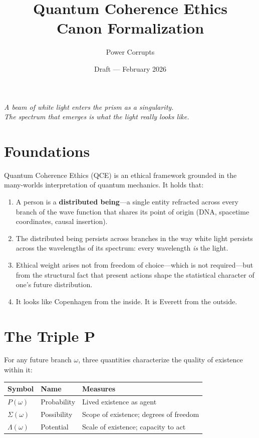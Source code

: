 \documentclass[12pt]{article}
\title{\textbf{Quantum Coherence Ethics}\\[4pt] Canon Formalization}
\author{Power Corrupts}
\date{Draft --- February 2026}
\begin{document}
\maketitle

\begin{center}
\textit{A beam of white light enters the prism as a singularity.\\
The spectrum that emerges is what the light really looks like.}
\end{center}

\section{Foundations}

Quantum Coherence Ethics (QCE) is an ethical framework grounded in the many-worlds interpretation of quantum mechanics. It holds that:

\begin{enumerate}[label=(\roman*)]
\item A person is a \textbf{distributed being}---a single entity refracted across every branch of the wave function that shares its point of origin (DNA, spacetime coordinates, causal insertion).
\item The distributed being persists across branches in the way white light persists across the wavelengths of its spectrum: every wavelength \textit{is} the light.
\item Ethical weight arises not from freedom of choice---which is not required---but from the structural fact that present actions shape the statistical character of one's future distribution.
\item It looks like Copenhagen from the inside. It is Everett from the outside.
\end{enumerate}

\section{The Triple P}

For any future branch $\omega$, three quantities characterize the quality of existence within it:

\begin{center}
\begin{tabular}{lll}
\toprule
\textbf{Symbol} & \textbf{Name} & \textbf{Measures} \\
\midrule
$P(\omega)$ & Probability & Lived existence as agent \\
$\Sigma(\omega)$ & Possibility & Scope of existence; degrees of freedom \\
$\Lambda(\omega)$ & Potential & Scale of existence; capacity to act \\
\bottomrule
\end{tabular}
\end{center}
\end{document}
